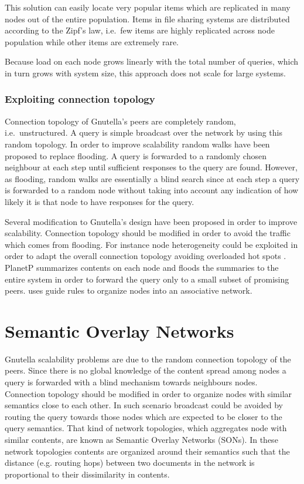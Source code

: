 This solution can easily locate very popular items which are replicated in many nodes out of the entire population. Items in file sharing systems are distributed according to the Zipf's law, i.e.\ few items are highly replicated across node population while other items are extremely rare.

Because load on each node grows linearly with the total number of queries, which in turn grows with system size, this approach does not scale for large systems.

\subsubsection{Exploiting connection topology}
Connection topology of Gnutella's peers are completely random, i.e.\ unstructured. A query is simple broadcast over the network by using this random topology. In order to improve scalability random walks have been proposed \cite{LCC+02} to replace flooding. A query is forwarded to a randomly chosen neighbour at each step until sufficient responses to the query are found. However, as flooding, random walks are essentially a blind search since at each step a query is forwarded to a random node without taking into account any indication of how likely it is that node to have responses for the query.

Several modification to Gnutella's design have been proposed in order to improve scalability. Connection topology should be modified in order to avoid the traffic which comes from flooding. For instance node heterogeneity could be exploited in order to adapt the overall connection topology avoiding overloaded hot spots \cite{CRB+03}. PlanetP \cite{CPM+03} summarizes contents on each node and floods the summaries to the entire system in order to forward the query only to a small subset of promising peers. \cite{CFK07} uses guide rules to organize nodes into an associative network.

\section{\label{sec:son}Semantic Overlay Networks}
Gnutella scalability problems are due to the random connection topology of the peers. Since there is no global knowledge of the content spread among nodes a query is forwarded with a blind mechanism towards neighbours nodes. Connection topology should be modified in order to organize nodes with similar semantics close to each other. In such scenario broadcast could be avoided by routing the query towards those nodes which are expected to be closer to the query semantics. That kind of network topologies, which aggregates node with similar contents, are known as Semantic Overlay Networks (SONs). In these network topologies contents are organized around their semantics such that the distance (e.g. routing hops) between two documents in the network is proportional to their dissimilarity in contents.

